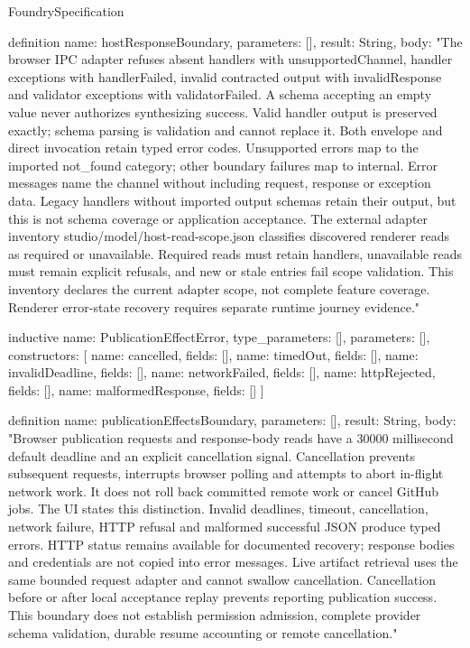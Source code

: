 \begin{lexlean}{FoundrySpecification}
\begin{semanticmodule}
definition{
  name: hostResponseBoundary,
  parameters: [],
  result: String,
  body: "The browser IPC adapter refuses absent handlers with unsupportedChannel, handler exceptions with handlerFailed, invalid contracted output with invalidResponse and validator exceptions with validatorFailed. A schema accepting an empty value never authorizes synthesizing success. Valid handler output is preserved exactly; schema parsing is validation and cannot replace it. Both envelope and direct invocation retain typed error codes. Unsupported errors map to the imported not_found category; other boundary failures map to internal. Error messages name the channel without including request, response or exception data. Legacy handlers without imported output schemas retain their output, but this is not schema coverage or application acceptance. The external adapter inventory studio/model/host-read-scope.json classifies discovered renderer reads as required or unavailable. Required reads must retain handlers, unavailable reads must remain explicit refusals, and new or stale entries fail scope validation. This inventory declares the current adapter scope, not complete feature coverage. Renderer error-state recovery requires separate runtime journey evidence."
}

inductive{
  name: PublicationEffectError,
  type_parameters: [],
  parameters: [],
  constructors: [
    {name: cancelled, fields: []},
    {name: timedOut, fields: []},
    {name: invalidDeadline, fields: []},
    {name: networkFailed, fields: []},
    {name: httpRejected, fields: []},
    {name: malformedResponse, fields: []}
  ]
}

definition{
  name: publicationEffectsBoundary,
  parameters: [],
  result: String,
  body: "Browser publication requests and response-body reads have a 30000 millisecond default deadline and an explicit cancellation signal. Cancellation prevents subsequent requests, interrupts browser polling and attempts to abort in-flight network work. It does not roll back committed remote work or cancel GitHub jobs. The UI states this distinction. Invalid deadlines, timeout, cancellation, network failure, HTTP refusal and malformed successful JSON produce typed errors. HTTP status remains available for documented recovery; response bodies and credentials are not copied into error messages. Live artifact retrieval uses the same bounded request adapter and cannot swallow cancellation. Cancellation before or after local acceptance replay prevents reporting publication success. This boundary does not establish permission admission, complete provider schema validation, durable resume accounting or remote cancellation."
}


\end{semanticmodule}
\end{lexlean}

